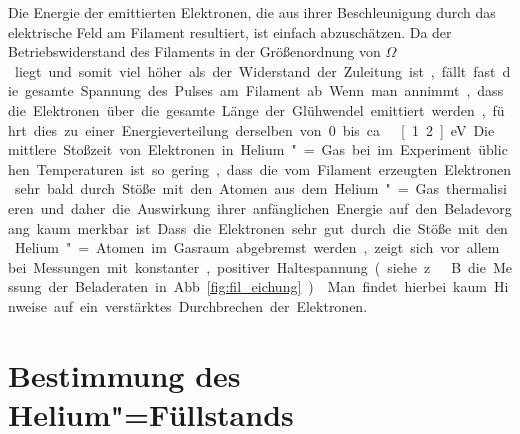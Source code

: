 Die Energie der emittierten Elektronen, die aus ihrer Beschleunigung durch das elektrische Feld am Filament resultiert, ist einfach abzuschätzen. Da der Betriebswiderstand des Filaments in der Größenordnung von \unit[100]{$\Omega$} liegt und somit viel höher als der Widerstand der Zuleitung ist, fällt fast die gesamte Spannung des Pulses am Filament ab. Wenn man annimmt, dass die Elektronen über die gesamte Länge der Glühwendel emittiert werden, führt dies zu einer Energieverteilung derselben von 0 bis ca.\ \unit[1.2]{eV}.

Die mittlere Stoßzeit von Elektronen in Helium"=Gas bei im Experiment üblichen Temperaturen ist so gering, dass die vom Filament erzeugten Elektronen sehr bald durch Stöße mit den Atomen aus dem Helium"=Gas thermalisieren und daher die Auswirkung ihrer anfänglichen Energie auf den Beladevorgang kaum merkbar ist. Dass die Elektronen sehr gut durch die Stöße mit den Helium"=Atomen im Gasraum abgebremst werden, zeigt sich vor allem bei Messungen mit konstanter, positiver Haltespannung (siehe z.\ B. die Messung der Beladeraten in Abb.~\ref{fig:fil_eichung}). \enlargethispage{\baselineskip}Man findet hierbei kaum Hinweise auf ein verstärktes Durchbrechen der Elektronen.


\section{Bestimmung des Helium"=Füllstands}

